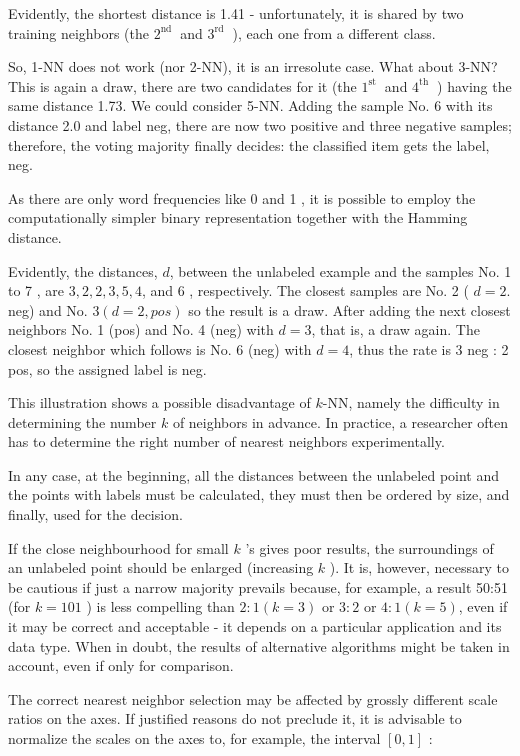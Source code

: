 \documentclass[10pt]{book}
\begin{document}
Evidently, the shortest distance is 1.41 - unfortunately, it is shared by two training neighbors (the $2^{\text {nd }}$ and $3^{\text {rd }}$ ), each one from a different class.

So, 1-NN does not work (nor 2-NN), it is an irresolute case. What about 3-NN? This is again a draw, there are two candidates for it (the $1^{\text {st }}$ and $4^{\text {th }}$ ) having the same distance 1.73. We could consider 5-NN. Adding the sample No. 6 with its distance 2.0 and label neg, there are now two positive and three negative samples; therefore, the voting majority finally decides: the classified item gets the label, neg.

As there are only word frequencies like 0 and 1 , it is possible to employ the computationally simpler binary representation together with the Hamming distance.

Evidently, the distances, $d$, between the unlabeled example and the samples No. 1 to 7 , are $3,2,2,3,5,4$, and 6 , respectively. The closest samples are No. 2 ( $d=2$. neg) and No. $3(d=2, p o s)$ so the result is a draw. After adding the next closest neighbors No. 1 (pos) and No. 4 (neg) with $d=3$, that is, a draw again. The closest neighbor which follows is No. 6 (neg) with $d=4$, thus the rate is 3 neg : 2 pos, so the assigned label is neg.

This illustration shows a possible disadvantage of $k$-NN, namely the difficulty in determining the number $k$ of neighbors in advance. In practice, a researcher often has to determine the right number of nearest neighbors experimentally.

In any case, at the beginning, all the distances between the unlabeled point and the points with labels must be calculated, they must then be ordered by size, and finally, used for the decision.

If the close neighbourhood for small $k$ 's gives poor results, the surroundings of an unlabeled point should be enlarged (increasing $k$ ). It is, however, necessary to be cautious if just a narrow majority prevails because, for example, a result 50:51 (for $k=101$ ) is less compelling than $2: 1(k=3)$ or $3: 2$ or $4: 1(k=5)$, even if it may be correct and acceptable - it depends on a particular application and its data type. When in doubt, the results of alternative algorithms might be taken in account, even if only for comparison.

The correct nearest neighbor selection may be affected by grossly different scale ratios on the axes. If justified reasons do not preclude it, it is advisable to normalize the scales on the axes to, for example, the interval $[0,1]$ :
\end{document}
